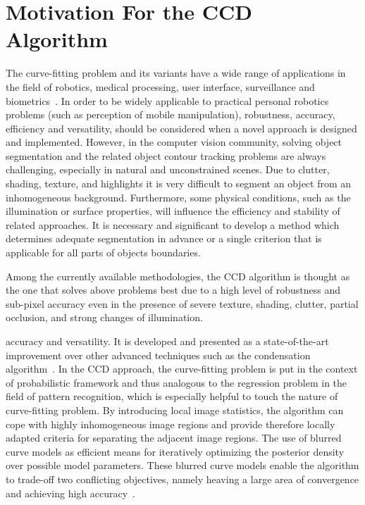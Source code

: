 \section{Motivation For the CCD Algorithm}
\label{sec:mccd}
The curve-fitting problem and its variants have a wide range of
applications in the field of robotics, medical processing, user
interface, surveillance and biometrics~\cite{hanek2004fitting}. In order to be
widely applicable to practical personal robotics problems (such as
perception of mobile manipulation), robustness,
accuracy, efficiency and versatility, should be
considered when a novel approach is designed and implemented.
However, in the computer vision community, solving object segmentation and the
related object contour tracking problems are always challenging,
especially in natural and unconstrained scenes. Due to clutter,
shading, texture, and highlights it is very difficult to segment
an object from an inhomogeneous background. Furthermore, some physical
conditions, such as the illumination or surface properties, will
influence the efficiency and stability of related approaches. It is
necessary and significant to develop a method which determines adequate segmentation
in advance or a single criterion that is applicable for all parts of objects boundaries.

Among the currently available methodologies, the CCD algorithm is
thought as the one that solves above problems best due to a high level
of robustness and sub-pixel accuracy even in the presence of severe
texture, shading, clutter, partial occlusion, and strong changes of
illumination.

 accuracy and versatility. It is developed and presented as a state-of-the-art
improvement over other advanced techniques such as the condensation
algorithm~\cite{isard1998icondensation}. In the CCD approach, the curve-fitting problem is
put in the context of probabilistic framework and thus analogous to
the regression problem in the field of pattern recognition, which is especially
helpful to touch the nature of curve-fitting problem. By introducing
local image statistics, the algorithm can cope with highly
inhomogeneous image regions and provide therefore locally adapted
criteria for separating the adjacent image regions. The use of blurred
curve models as efficient means for iteratively optimizing the
posterior density over possible model parameters. These blurred curve
models enable the algorithm to trade-off two conflicting objectives,
namely heaving a large area of convergence and achieving high
accuracy~\cite{hanek2004fitting}. 

